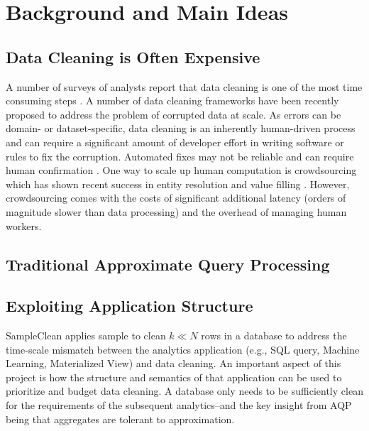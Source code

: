 \section{Background and Main Ideas}


\subsection{Data Cleaning is Often Expensive}
A number of surveys of analysts report that data cleaning is one of the most time consuming steps \cite{kandel2012enterprise, nytimes}.
A number of data cleaning frameworks have been recently proposed to address the problem of corrupted data at scale\cite{khayyat2015bigdansing, chu2015katara, sampleclean}.
As errors can be domain- or dataset-specific, data cleaning is an inherently human-driven process and can require a significant amount of developer effort in writing software or rules to fix the corruption.
Automated fixes may not be reliable and can require human confirmation \cite{DBLP:journals/pvldb/YakoutENOI11}.
One way to scale up human computation is crowdsourcing which has shown recent success in entity resolution and value filling \cite{gokhale2014corleone, park2014crowdfill, sampleclean,chu2015katara}.
However, crowdsourcing comes with the costs of significant additional latency (orders of magnitude slower than data processing) and the overhead of managing human workers.

\subsection{Traditional Approximate Query Processing}


\subsection{Exploiting Application Structure}


SampleClean applies sample to clean $k\ll N$ rows in a database to address the time-scale mismatch between the analytics application (e.g., SQL query, Machine Learning, Materialized View) and data cleaning.
An important aspect of this project is how the structure and semantics of that application can be used to prioritize and budget data cleaning.
A database only needs to be sufficiently clean for the requirements of the subsequent analytics--and the key insight from AQP being that aggregates are tolerant to approximation.

